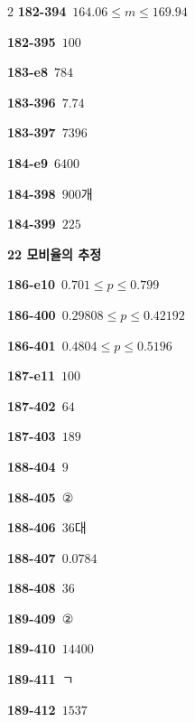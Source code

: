 \documentclass[10pt,a4paper]{article}
\begin{document}
\begin{multicols}{2}
\noindent\textbf{182-394}\ $164.06\le m\le 169.94$\par
\noindent\textbf{182-395}\ $100$\par
\noindent\textbf{183-e8}\ $784$\par
\noindent\textbf{183-396}\ $7.74$\par
\noindent\textbf{183-397}\ $7396$\par
\noindent\textbf{184-e9}\ $6400$\par
\noindent\textbf{184-398}\ $900$개\par
\noindent\textbf{184-399}\ $225$\par
\noindent\textbf{22 모비율의 추정}\par\smallskip
\noindent\textbf{186-e10}\ $0.701\le p\le 0.799$\par
\noindent\textbf{186-400}\ $0.29808\le p\le 0.42192$\par
\noindent\textbf{186-401}\ $0.4804\le p\le 0.5196$\par
\noindent\textbf{187-e11}\ $100$\par
\noindent\textbf{187-402}\ $64$\par
\noindent\textbf{187-403}\ $189$\par
\noindent\textbf{188-404}\ $9$\par
\noindent\textbf{188-405}\ ②\par
\noindent\textbf{188-406}\ $36$대\par
\noindent\textbf{188-407}\ $0.0784$\par
\noindent\textbf{188-408}\ $36$\par
\noindent\textbf{189-409}\ ②\par
\noindent\textbf{189-410}\ $14400$\par
\noindent\textbf{189-411}\ ㄱ\par
\noindent\textbf{189-412}\ $1537$\par
\end{multicols}
\end{document}
